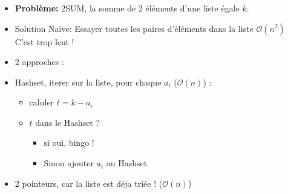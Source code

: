\begin{frame}
    \frametitle{\problemtitle}
    \begin{itemize}
        \item<+-> \textbf{Problème:} 2SUM, la somme de 2 éléments d'une liste égale $k$.
        \item<+-> Solution Na\"ive: Essayer toutes les paires d'éléments dans la liste $\mathcal O(n^2)$ C'est trop lent !
        \item<+-> 2 approches :
        \item<+-> Hashset, iterer sur la liste, pour chaque $a_i$ ($\mathcal O(n)$) :
        \begin{itemize}
            \item<+-> caluler $t = k - a_i$
            \item<+-> $t$ dans le Hashset ?
            \begin{itemize}
                \item si oui, bingo !
                \item Sinon ajouter $a_i$ au Hashset
            \end{itemize}
        \end{itemize}
        \item<+-> 2 pointeurs, car la liste est déja triée ! ($\mathcal O(n)$)
    \end{itemize}
\end{frame}
